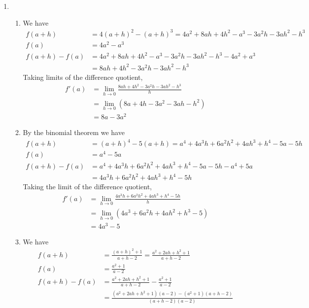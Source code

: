 \documentclass{article}
\begin{document}
\begin{enumerate}
\begin{figure}[htbp]
    \label{fig:four-conditions-2}
  \end{figure}
\item %
  \begin{enumerate}
  \item We have
    \begin{align*}
      f(a+h) &= 4(a+h)^2 - (a+h)^3
               = 4a^2 + 8ah + 4h^2 - a^3 - 3a^2h - 3ah^2 - h^3 \\
      f(a) &= 4a^2 - a^3 \\
      f(a+h)-f(a) &= 4a^2 + 8ah + 4h^2 - a^3 - 3a^2 h - 3ah^2 - h^3 - 4a^2 + a^3
      \\
             &= 8ah + 4h^2 - 3a^2 h - 3ah^2 - h^3
    \end{align*}
    Taking limits of the difference quotient,
    \begin{align*}
      f'(a) &= \lim_{h\to 0} \frac{8ah+4h^2-3a^2h-3ah^2-h^3}{h} \\
            &= \lim_{h\to 0} (8a + 4h - 3a^2 - 3ah - h^2) \\
            &= 8a - 3a^2
    \end{align*}
  \item By the binomial theorem we have
    \begin{align*}
      f(a+h) &= (a+h)^4 - 5(a+h) = a^4 + 4a^3h+6a^2h^2+4ah^3+h^4-5a-5h \\
      f(a) &= a^4 - 5a \\
      f(a+h)-f(a) &= a^4 + 4a^3h + 6a^2h^2 + 4ah^3 + h^4 - 5a - 5h - a^4 + 5a \\
             &=4a^3h + 6a^2h^2 + 4ah^3 + h^4 - 5h
    \end{align*}
    Taking the limit of the difference quotient,
    \begin{align*}
      f'(a) &= \lim_{h\to 0} \frac{4a^3h + 6a^2h^2 + 4ah^3 + h^4 - 5h}{h} \\
            &= \lim_{h\to 0} (4a^3 + 6a^2 h + 4ah^2 + h^3 - 5) \\
            &= 4a^3 - 5
    \end{align*}
  \item We have
    \begin{align*}
      f(a+h) &= \frac{(a+h)^2 + 1}{a+h-2} = \frac{a^2+2ah+h^2+1}{a+h-2} \\
      f(a) &= \frac{a^2+1}{a-2} \\
      f(a+h)-f(a) &= \frac{a^2+2ah+h^2+1}{a+h-2} - \frac{a^2+1}{a-2} \\
             &= \frac{(a^2+2ah+h^2+1)(a-2)-(a^2+1)(a+h-2)}{(a+h-2)(a-2)} \\

\end{align*}
\end{enumerate}
\end{enumerate}
\end{document}
